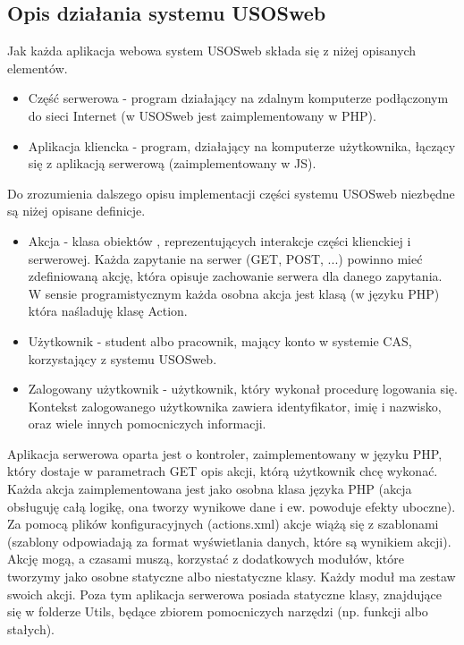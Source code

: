 \documentclass[licencjacka]{pracamgr}
\begin{document}
\subsection{Opis działania systemu USOSweb}
Jak każda aplikacja webowa system USOSweb składa się z niżej opisanych elementów.
\begin{itemize}
  \item
  Część serwerowa - program działający na zdalnym komputerze podłączonym do sieci Internet (w USOSweb jest zaimplementowany w PHP).
  \item
  Aplikacja kliencka - program, działający na komputerze użytkownika, łączący się z aplikacją serwerową (zaimplementowany w JS).
\end{itemize}


Do zrozumienia dalszego opisu implementacji części systemu USOSweb niezbędne są niżej opisane definicje.
\begin{itemize}
  \item
  Akcja - klasa obiektów , reprezentujących interakcje części klienckiej i serwerowej. Każda zapytanie na serwer (GET, POST, ...) powinno mieć zdefiniowaną akcję, która opisuje zachowanie serwera dla danego zapytania. W sensie programistycznym każda osobna akcja jest klasą (w języku PHP) która naśladuję klasę Action.
  \item
  Użytkownik - student albo pracownik, mający konto w systemie CAS, korzystający z systemu USOSweb.
  \item
  Zalogowany użytkownik - użytkownik, który wykonał procedurę logowania się. Kontekst zalogowanego użytkownika zawiera identyfikator, imię i nazwisko, oraz wiele innych pomocniczych informacji. 
\end{itemize}

Aplikacja serwerowa oparta jest o kontroler, zaimplementowany w języku PHP, który dostaje w parametrach GET opis akcji, którą użytkownik chcę wykonać. Każda akcja zaimplementowana jest jako osobna klasa języka PHP (akcja obsługuję całą logikę, ona tworzy wynikowe dane i ew. powoduje efekty uboczne). Za pomocą plików konfiguracyjnych (actions.xml) akcje wiążą się z szablonami (szablony odpowiadają za format wyświetlania danych, które są wynikiem akcji). Akcję mogą, a czasami muszą, korzystać z dodatkowych modułów, które tworzymy jako osobne statyczne albo niestatyczne klasy. Każdy moduł ma zestaw swoich akcji. Poza tym aplikacja serwerowa posiada statyczne klasy, znajdujące się w folderze Utils, będące zbiorem pomocniczych narzędzi (np. funkcji albo stałych).
\end{document}

